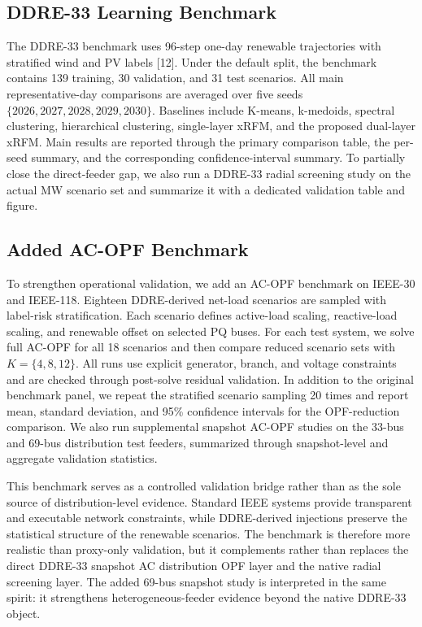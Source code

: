 \documentclass[journal]{IEEEtran}
\begin{document}
\subsection{DDRE-33 Learning Benchmark}
The DDRE-33 benchmark uses 96-step one-day renewable trajectories with stratified wind and PV labels [12]. Under the default split, the benchmark contains 139 training, 30 validation, and 31 test scenarios. All main representative-day comparisons are averaged over five seeds $\{2026,2027,2028,2029,2030\}$. Baselines include K-means, k-medoids, spectral clustering, hierarchical clustering, single-layer xRFM, and the proposed dual-layer xRFM. Main results are reported through the primary comparison table, the per-seed summary, and the corresponding confidence-interval summary. To partially close the direct-feeder gap, we also run a DDRE-33 radial screening study on the actual MW scenario set and summarize it with a dedicated validation table and figure.

\subsection{Added AC-OPF Benchmark}
To strengthen operational validation, we add an AC-OPF benchmark on IEEE-30 and IEEE-118. Eighteen DDRE-derived net-load scenarios are sampled with label-risk stratification. Each scenario defines active-load scaling, reactive-load scaling, and renewable offset on selected PQ buses. For each test system, we solve full AC-OPF for all 18 scenarios and then compare reduced scenario sets with $K=\{4,8,12\}$. All runs use explicit generator, branch, and voltage constraints and are checked through post-solve residual validation. In addition to the original benchmark panel, we repeat the stratified scenario sampling 20 times and report mean, standard deviation, and 95\% confidence intervals for the OPF-reduction comparison. We also run supplemental snapshot AC-OPF studies on the 33-bus and 69-bus distribution test feeders, summarized through snapshot-level and aggregate validation statistics.

This benchmark serves as a controlled validation bridge rather than as the sole source of distribution-level evidence. Standard IEEE systems provide transparent and executable network constraints, while DDRE-derived injections preserve the statistical structure of the renewable scenarios. The benchmark is therefore more realistic than proxy-only validation, but it complements rather than replaces the direct DDRE-33 snapshot AC distribution OPF layer and the native radial screening layer. The added 69-bus snapshot study is interpreted in the same spirit: it strengthens heterogeneous-feeder evidence beyond the native DDRE-33 object.
\end{document}
